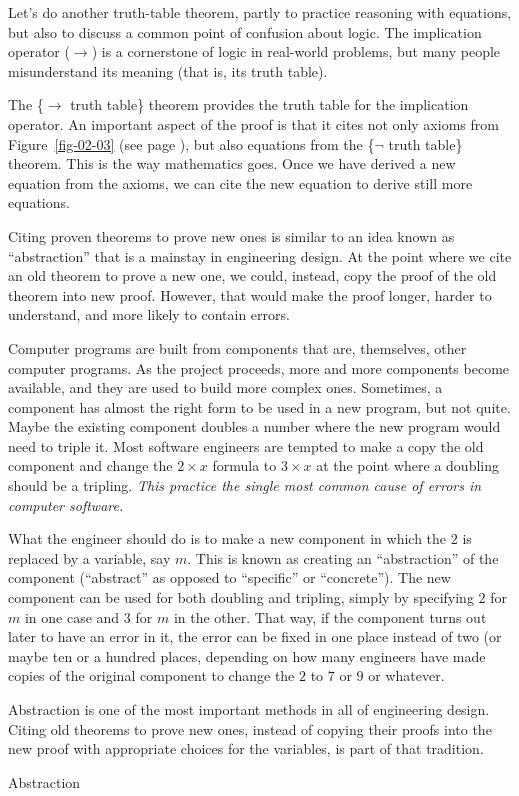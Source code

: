 Let's do another truth-table theorem, partly to practice
reasoning with equations, but also to discuss a common
point of confusion about logic. The implication operator
($\rightarrow$) is a cornerstone of logic in real-world problems,
but many people misunderstand its meaning (that is, its truth table).

The \{$\rightarrow$ truth table\} theorem provides the truth table for the implication operator. An important aspect of the proof is that it cites not only axioms from Figure~\ref{fig-02-03} (see page \pageref{fig-02-03}),
but also equations from the \{$\neg$ truth table\} theorem. This is the way mathematics goes. Once we have derived a new equation from the axioms, we can cite the new equation to derive still more equations.

\begin{aside}
 Citing proven theorems to prove new ones is similar to an idea known as ``abstraction''
 that is a mainstay in engineering design.
 At the point where we cite an old theorem to prove a new one,
 we could, instead, copy the proof of the old theorem into new proof.
 However, that would make the proof longer, harder to understand,
 and more likely to contain errors.

 Computer programs are built from components that are, themselves, other computer programs. As the project proceeds, more and more components become available, and they are used to build more complex ones. Sometimes, a component has almost the right form to be used in a new program, but not quite. Maybe the existing component doubles a number where the new program would need to triple it. Most software engineers are tempted to make a copy the old component and change the $2 \times x$ formula to $3 \times x$ at the point where a doubling should be a tripling. \emph{This practice the single most common cause of errors in computer software.}

 What the engineer should do is to make a new component in which the $2$ is replaced by a variable, say $m$. This is known as creating an ``abstraction'' of the component (``abstract'' as opposed to ``specific'' or ``concrete''). The new component can be used for both doubling and tripling, simply by specifying $2$ for $m$ in one case and $3$ for $m$ in the other. That way, if the component turns out later to have an error in it, the error can be fixed in one place instead of two (or maybe ten or a hundred places, depending on how many engineers have made copies of the original component to change the $2$ to $7$ or $9$ or whatever.

Abstraction is one of the most important methods in all of engineering design. Citing old theorems to prove new ones, instead of copying their proofs into the new proof with appropriate choices for the variables, is part of that tradition.

\caption{Abstraction}
\label{abstraction}
\end{aside}

